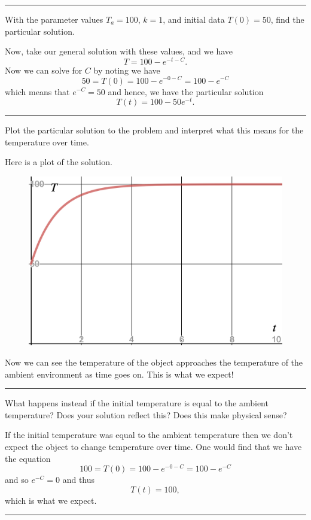 \documentclass[12pt]{article} %
\begin{document}
\hrule

\begin{problem}
    With the parameter values $T_a=100$, $k=1$, and initial data $T(0)=50$, find the particular solution.
\end{problem}
\begin{solution}
Now, take our general solution with these values, and we have
\[
T=100-e^{-t-C}.
\]
Now we can solve for $C$ by noting we have 
\[
50=T(0)=100-e^{-0-C}=100-e^{-C}
\]
which means that $e^{-C}=50$ and hence, we have the particular solution
\[
T(t)=100-50e^{-t}.
\]
\end{solution}

\hrule

\begin{problem}
    Plot the particular solution to the problem and interpret what this means for the temperature over time.
\end{problem}
\begin{solution}
Here is a plot of the solution.
\begin{figure}[H]
    \centering
    \includegraphics[width=.4\textwidth]{Worksheet_2/desmos-graph(20).png}
\end{figure}
Now we can see the temperature of the object approaches the temperature of the ambient environment as time goes on. This is what we expect!
\end{solution}

\hrule

\begin{problem}
    What happens instead if the initial temperature is equal to the ambient temperature? Does your solution reflect this? Does this make physical sense?
\end{problem}
\begin{solution}
If the initial temperature was equal to the ambient temperature then we don't expect the object to change temperature over time.  One would find that we have the equation
\[
100=T(0)=100-e^{-0-C}=100-e^{-C}
\]
and so $e^{-C}=0$ and thus
\[
T(t)=100,
\]
which is what we expect.
\end{solution}

\hrule
\end{document}
